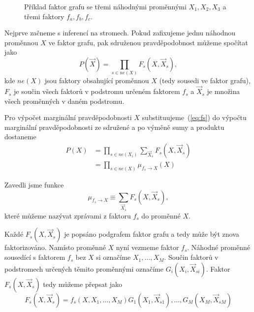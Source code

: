 \begin{figure}[H]
\begin{center}
\end{center}
\caption{Příklad faktor grafu se třemi náhodnými proměnnými $X_1, X_2, X_3$ a třemi faktory $f_a, f_b, f_c$.}
\end{figure}

Nejprve začneme s inferencí na stromech.
Pokud zafixujeme jednu náhodnou proměnnou $X$ ve faktor grafu, pak sdruženou pravděpodobnost můžeme spočítat jako
\begin{equation}
    P(\vec{X}) = \prod_{s \in ne(X)} F_s(X, \vec{X}_s),
\label{eq:fs}
\end{equation}
kde $ne(X)$ jsou faktory obsahující proměnnou $X$ (tedy sousedi ve faktor grafu), $F_s$ je součin všech faktorů v podstromu určeném faktorem $f_s$ a $\vec{X}_s$ je množina všech proměnných v daném podstromu.

Pro výpočet marginální pravděpodobnosti $X$ substituujeme~(\ref{eq:fs}) do výpočtu marginální pravděpodobnosti ze sdružené a po výměně sumy a produktu dostaneme
\begin{align}
P(X) &= \prod_{s \in ne(X_i)} \sum_{\vec{X}_s} F_s(X, \vec{X}_s)
\\
&= \prod_{s \in ne(X)} \mu_{f_s \rightarrow X}(X)
\label{eq:margx}
\end{align}

Zavedli jsme funkce
\begin{equation}
    \mu_{f_s \rightarrow X} \equiv \sum_{\vec{X}_s} F_s(X, \vec{X}_s),
\label{eq:defmsgfx}
\end{equation}
které můžeme nazývat zprávami z faktoru $f_s$ do proměnné $X$.

Každé $F_s(X, \vec{X}_s)$ je popsáno podgrafem faktor grafu a tedy může být znova faktorizováno.
Namísto proměnné $X$ nyní vezmeme faktor $f_s$.
Náhodné proměnné sousedící s faktorem $f_s$ bez $X$ si označíme $X_1, \dots, X_M$.
Součin faktorů v podstromech určených těmito proměnnými označíme $G_i(X_i, \vec{X}_{si})$.
Faktor $F_s(X, \vec{X}_s)$ tedy můžeme přepsat jako
\begin{equation}
F_s(X, \vec{X}_s) = f_s(X, X_1, \dots, X_M) G_1(X_1, \vec{X}_{s1}), \dots, G_M(X_M, \vec{X}_{sM})
\end{equation}

